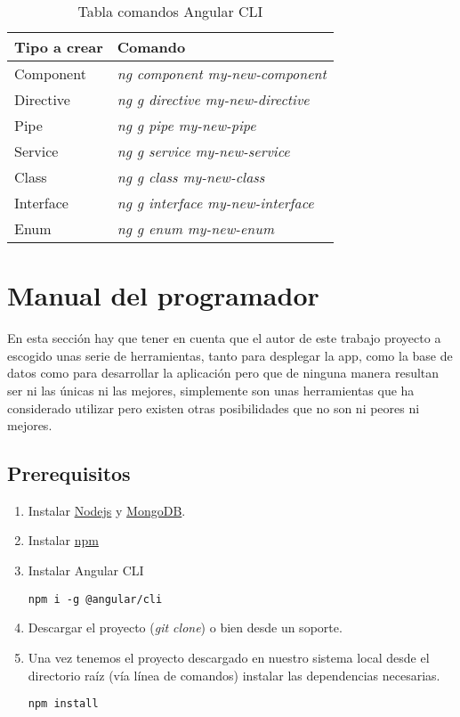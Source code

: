    
\begin{table}[htbp]
\begin{center}
\begin{tabular}{|l|l|}
\hline
Tipo a crear & Comando  \\
\hline \hline
Component & \emph{ng component my-new-component}  \\ \hline
Directive & \emph{ng g directive my-new-directive}  \\ \hline
Pipe & \emph{ng g pipe my-new-pipe}  \\ \hline
Service & \emph{ng g service my-new-service}  \\ \hline
Class & \emph{ng g class my-new-class}  \\ \hline
Interface & \emph{ng g interface my-new-interface}  \\ \hline
Enum & \emph{ng g enum my-new-enum}  \\ \hline
\end{tabular}
\caption{Tabla comandos Angular CLI}
\end{center}
\end{table}
   


\section{Manual del programador}
En esta sección hay que tener en cuenta que el autor de este trabajo proyecto a escogido unas serie de herramientas, tanto para desplegar la app, como la base de datos como para desarrollar la aplicación pero que de ninguna manera resultan ser ni las únicas ni las mejores, simplemente son unas herramientas que ha considerado utilizar pero existen otras posibilidades que no son ni peores ni mejores.

\subsection{Prerequisitos}
\begin{enumerate}
	\item Instalar \href{https://nodejs.org/en/}{Nodejs} y \href{https://www.mongodb.com/}{MongoDB}.
	\item Instalar \href{https://www.npmjs.com/}{npm}
	\item Instalar Angular CLI
		\lstset{language=C, breaklines=true, basicstyle=\footnotesize}
		\begin{lstlisting}[frame=single]
		npm i -g @angular/cli
    	\end{lstlisting}
    \item Descargar el proyecto (\emph{git clone}) o bien desde un soporte.
	\item Una vez tenemos el proyecto descargado en nuestro sistema local desde el directorio raíz (vía línea de comandos) instalar las dependencias necesarias.
	\lstset{language=C, breaklines=true, basicstyle=\footnotesize}
		\begin{lstlisting}[frame=single]
		npm install
    	\end{lstlisting}
\end{enumerate}


